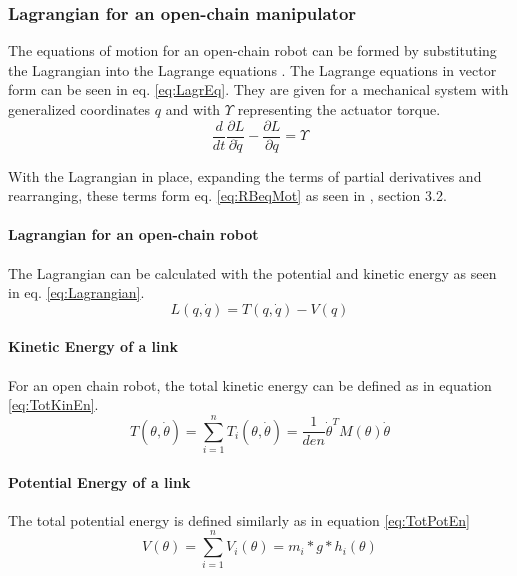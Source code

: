 \subsubsection{Lagrangian for an open-chain manipulator}

The equations of motion for an open-chain robot can be formed by substituting the Lagrangian into the Lagrange equations . 
The Lagrange equations in vector form can be seen in eq. \ref{eq:LagrEq}. They are given for a mechanical system with generalized coordinates $q$ and with $\Upsilon$ representing the actuator torque.
\begin{equation} \label{eq:LagrEq}
\frac{d}{dt}\frac{\partial L}{\partial \dot{q}} - \frac{\partial L}{\partial q} = \Upsilon
\end{equation}

With the Lagrangian in place, expanding the terms of partial derivatives and rearranging, these terms form eq. \ref{eq:RBeqMot} as seen in \cite{MathIntroRobManip}, section 3.2.\\

\paragraph{Lagrangian for an open-chain robot}

The Lagrangian can be calculated with the potential and kinetic energy as seen in eq. \ref{eq:Lagrangian}. 
\begin{equation} \label{eq:Lagrangian}
	L(q,\dot{q}) = T(q,\dot{q}) - V(q)
\end{equation} 



\paragraph{Kinetic Energy of a link}
For an open chain robot, the total kinetic energy can be defined as in equation \ref{eq:TotKinEn}.
\begin{equation}\label{eq:TotKinEn}
T(\theta,\dot{\theta}) = \sum_{i=1}^{n} T_i(\theta,\dot{\theta}) = \frac{1}{den} \dot{\theta}^T M(\theta)\dot{\theta}
\end{equation}

\paragraph{Potential Energy of a link}
The total potential energy is defined similarly as in equation \ref{eq:TotPotEn}
\begin{equation}\label{eq:TotPotEn}
V(\theta)=\sum_{i=1}^{n} V_i(\theta) = m_i*g*h_i(\theta)
\end{equation}

